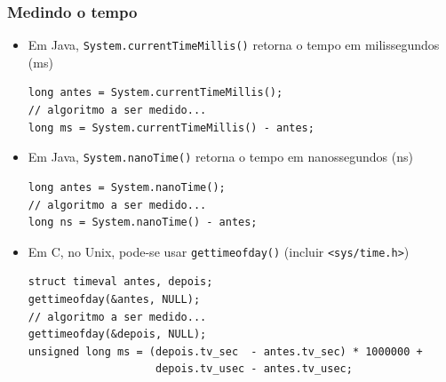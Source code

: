 \documentclass[aspectratio=169]{beamer}
\begin{document}
\begin{frame}[fragile]\frametitle{Medindo o tempo}
\begin{itemize}
	\item Em Java, \texttt{System.currentTimeMillis()} retorna o tempo em milissegundos (ms)
{\scriptsize
\begin{lstlisting}
long antes = System.currentTimeMillis();
// algoritmo a ser medido...
long ms = System.currentTimeMillis() - antes;
\end{lstlisting}}
	\item Em Java, \texttt{System.nanoTime()} retorna o tempo em nanossegundos (ns)
{\scriptsize
\begin{lstlisting}
long antes = System.nanoTime();
// algoritmo a ser medido...
long ns = System.nanoTime() - antes;
\end{lstlisting}}
	\item Em C, no Unix, pode-se usar \texttt{gettimeofday()} (incluir \texttt{<sys/time.h>})
{\scriptsize\begin{lstlisting}
struct timeval antes, depois;
gettimeofday(&antes, NULL);
// algoritmo a ser medido...
gettimeofday(&depois, NULL);
unsigned long ms = (depois.tv_sec  - antes.tv_sec) * 1000000 +
                    depois.tv_usec - antes.tv_usec;
\end{lstlisting}}

\end{itemize}
\end{frame}
\end{document}
